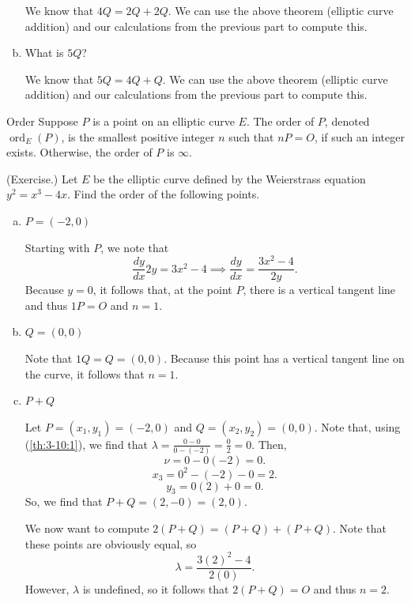 \documentclass[letterpaper]{article}
\DeclareMathOperator{\ord}{ord}
\begin{document}
\begin{mdframed}
\begin{enumerate}[(a)]
        \begin{mdframed}
            We know that $4Q = 2Q + 2Q$. We can use the above theorem (elliptic curve addition) and our calculations from the previous part to compute this.
        \end{mdframed}
        \item What is $5Q$? 
        \begin{mdframed}
            We know that $5Q = 4Q + Q$.  We can use the above theorem (elliptic curve addition) and our calculations from the previous part to compute this.
        \end{mdframed}
    \end{enumerate}
\end{mdframed}

\begin{definition}{Order}{}
    Suppose $P$ is a point on an elliptic curve $E$. The order of $P$, denoted $\ord_{E}(P)$, is the smallest positive integer $n$ such that $nP = O$, if such an integer exists. Otherwise, the order of $P$ is $\infty$. 
\end{definition}

\begin{mdframed}
    (Exercise.) Let $E$ be the elliptic curve defined by the Weierstrass equation $y^2 = x^3 - 4x$. Find the order of the following points. 
    \begin{enumerate}[(a)]
        \item $P = (-2, 0)$
        \begin{mdframed}
            Starting with $P$, we note that 
            \[\frac{dy}{dx} 2y = 3x^2 - 4 \implies \frac{dy}{dx} = \frac{3x^2 - 4}{2y}.\] Because $y = 0$, it follows that, at the point $P$, there is a vertical tangent line and thus $1P = O$ and $n = 1$. 
        \end{mdframed}
        \item $Q = (0, 0)$
        \begin{mdframed}
            Note that $1Q = Q = (0, 0)$. Because this point has a vertical tangent line on the curve, it follows that $n = 1$.  
        \end{mdframed}
        \item $P + Q$
        \begin{mdframed}
            Let $P = (x_1, y_1) = (-2, 0)$ and $Q = (x_2, y_2) = (0, 0)$. Note that, using (\ref{th:3-10:1}), we find that $\lambda = \frac{0 - 0}{0 - (-2)} = \frac{0}{2} = 0$. Then, 
            \[\nu = 0 - 0(-2) = 0.\]
            \[x_3 = 0^2 - (-2) - 0 = 2.\]
            \[y_3 = 0(2) + 0 = 0.\]
            So, we find that $P + Q = (2, -0) = (2, 0)$. 
            
            \bigskip 

            We now want to compute $2(P + Q) = (P + Q) + (P + Q)$. Note that these points are obviously equal, so 
            \[\lambda = \frac{3(2)^2 - 4}{2(0)}.\]
            However, $\lambda$ is undefined, so it follows that $2(P + Q) = O$ and thus $n = 2$. 
        \end{mdframed}
    \end{enumerate}
\end{mdframed}
\end{document}
